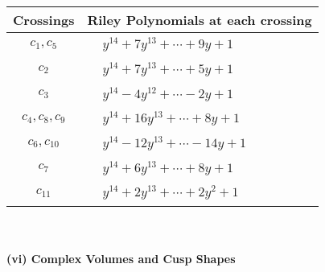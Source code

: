 \documentclass[1p]{elsarticle_modified}
\theoremstyle{definition}
\begin{document}
\begin{tabular}{m{50pt}|m{274pt}}
Crossings & \hspace{64pt}Riley Polynomials at each crossing \\
\hline $$\begin{aligned}c_{1},c_{5}\end{aligned}$$&$\begin{aligned}
&y^{14}+7 y^{13}+\cdots+9 y+1
\end{aligned}$\\
\hline $$\begin{aligned}c_{2}\end{aligned}$$&$\begin{aligned}
&y^{14}+7 y^{13}+\cdots+5 y+1
\end{aligned}$\\
\hline $$\begin{aligned}c_{3}\end{aligned}$$&$\begin{aligned}
&y^{14}-4 y^{12}+\cdots-2 y+1
\end{aligned}$\\
\hline $$\begin{aligned}c_{4},c_{8},c_{9}\end{aligned}$$&$\begin{aligned}
&y^{14}+16 y^{13}+\cdots+8 y+1
\end{aligned}$\\
\hline $$\begin{aligned}c_{6},c_{10}\end{aligned}$$&$\begin{aligned}
&y^{14}-12 y^{13}+\cdots-14 y+1
\end{aligned}$\\
\hline $$\begin{aligned}c_{7}\end{aligned}$$&$\begin{aligned}
&y^{14}+6 y^{13}+\cdots+8 y+1
\end{aligned}$\\
\hline $$\begin{aligned}c_{11}\end{aligned}$$&$\begin{aligned}
&y^{14}+2 y^{13}+\cdots+2 y^2+1
\end{aligned}$\\
\hline
\end{tabular}\\~\\
\newpage\flushleft \textbf{(vi) Complex Volumes and Cusp Shapes}
\end{document}
